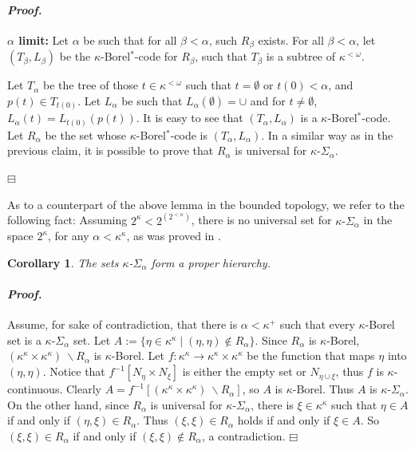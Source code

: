 \documentclass[12pt,a4paper]{amsart}
\newtheorem{cor}[thm]{Corollary}
\theoremstyle{definition}
\theoremstyle{remark}
\renewcommand{\mid}{\mathrel{|}\allowbreak}
\newenvironment{cproof}{\paragraph{\emph{Proof.\,}}}{\hfill{$\boxminus$}\par\vspace{2mm}}
\def\borelstar{Borel\nobreak\hspace{1pt}$^*$}
\begin{document}
\begin{cproof}
    {\bf $\alpha$ limit:} Let $\alpha$ be such that for all $\beta<\alpha$, such $R_\beta$ exists. For all $\beta<\alpha$, let $(T_\beta,L_\beta)$ be the $\kappa$-\borelstar-code for $R_\beta$, such that $T_\beta$ is a subtree of $\kappa^{<\omega}$.

    Let $T_\alpha$ be the tree of those $t\in \kappa^{<\omega}$ such that $t=\emptyset$ or $t(0)<\alpha$, and $p(t)\in T_{t(0)}$. Let $L_\alpha$ be such that $L_\alpha(\emptyset)=\cup$ and for $t\neq\emptyset$, $L_\alpha(t)=L_{t(0)}(p(t))$. It is easy to see that $(T_{\alpha},L_{\alpha})$ is a $\kappa$-\borelstar-code.
    Let $R_\alpha$ be the set whose $\kappa$-\borelstar-code is $(T_\alpha,L_\alpha)$.
    In a similar way as in the previous claim, it is possible to prove that $R_\alpha$ is universal for $\kappa$-$\Sigma_\alpha$.

\end{cproof}

As to a counterpart of the above lemma in the bounded topology, we refer to the following fact: Assuming $2^\kappa<2^{(2^{<\kappa})}$, there is no universal set for $\kappa\text{-}\Sigma_{\alpha}$ in the space $2^\kappa$, for any $\alpha<\kappa^\kappa$, as was proved in 
 \cite[Corollary 4.16]{MR3093397}.

\begin{cor}\label{proper_hierarchy}
    The sets $\kappa$-$\Sigma_\alpha$ form a proper hierarchy.
\end{cor}
\begin{cproof}
    Assume, for sake of contradiction, that there is $\alpha<\kappa^+$ such that every $\kappa$-Borel set is a $\kappa$-$\Sigma_\alpha$ set. Let $A:=\{\eta\in \kappa^\kappa\mid (\eta,\eta)\notin R_\alpha\}$. Since $R_\alpha$ is $\kappa$-Borel, $(\kappa^\kappa\times\kappa^\kappa)\ \backslash R_\alpha$ is $\kappa$-Borel. Let $f:\kappa^\kappa\rightarrow\kappa^\kappa\times\kappa^\kappa$ be the function that maps $\eta$ into $(\eta,\eta)$. Notice that $f^{-1}[N_\eta\times N_\xi]$ is either the empty set or $N_{\eta\cup\xi}$, thus $f$ is $\kappa$-continuous. Clearly $A=f^{-1}[(\kappa^\kappa\times\kappa^\kappa)\ \backslash R_\alpha]$, so $A$ is $\kappa$-Borel. Thus $A$ is $\kappa$-$\Sigma_\alpha$. On the other hand, since $R_\alpha$ is universal for $\kappa$-$\Sigma_\alpha$, there is $\xi\in\kappa^\kappa$ such that $\eta\in A$ if and only if $(\eta,\xi)\in R_\alpha$. Thus $(\xi,\xi)\in R_\alpha$ holds if and only if $\xi\in A$. So $(\xi,\xi)\in R_\alpha$ if and only if $(\xi,\xi)\notin R_\alpha$, a contradiction. 
\end{cproof}
\end{document}

